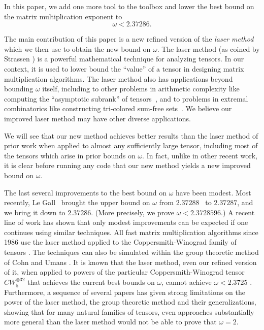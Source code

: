 \documentclass{theoretics}
\begin{document}
In this paper, we add one more tool to the toolbox and lower the best bound on the matrix multiplication exponent to $$\omega<2.37286.$$ 

The main contribution of this paper is a new refined version of the {\em laser method} which we then use to obtain the new bound on $\omega$. The laser method (as coined by Strassen \cite{laser}) is a powerful mathematical technique for analyzing tensors. In our context, it is used to lower bound the ``value'' of a tensor in designing matrix multiplication algorithms. The laser method also has applications beyond bounding $\omega$ itself, including to other problems in arithmetic complexity like computing the ``asymptotic subrank'' of tensors~\cite{Alman19}, and to problems in extremal combinatorics like constructing tri-colored sum-free sets~\cite{kleinberg}. We believe our improved laser method may have other diverse applications.

We will see that our new method achieves better results than the laser method of prior work when applied to almost any sufficiently large tensor, including most of the tensors which arise in prior bounds on $\omega$. In fact, unlike in other recent work, it is clear before running any code that our new method yields a new improved bound on $\omega$.



The last several improvements to the best bound on $\omega$ have been modest. Most recently, Le Gall~\cite{legall} brought the upper bound on $\omega$ from $2.37288$~\cite{v12} to $2.37287$, and we bring it down to $2.37286$. (More precisely, we prove $\omega < 2.3728596$.)
A recent line of work has shown that only modest improvements can be expected if one continues using similar techniques. All fast matrix multiplication algorithms since 1986 use the laser method applied to the Coppersmith-Winograd family of tensors \cite{coppersmith}. The techniques can also be simulated within the group theoretic method of Cohn and Umans \cite{cohn2003group,cohn2005group,cohn2013fast}. 
It is known that the laser method, even our refined version of it, when applied to powers of the particular Coppersmith-Winograd tensor $CW^{\otimes 32}_5$ that achieves the current best bounds on $\omega$, cannot achieve $\omega<2.3725$ \cite{ambainis}. 
Furthermore, a sequence of several papers \cite{ambainis,sunfl,blasiak,blasiak2017groups,almanitcs,aw2,Alman19,ChristandlVZ19,blaser2020slice,wojtala2023irreversibility,blasiak2023matrix} has given strong limitations on the power of the laser method, the group theoretic method and their generalizations, showing that for many natural families of tensors, even approaches substantially more general than the laser method would not be able to prove that $\omega=2$. 
\end{document}
